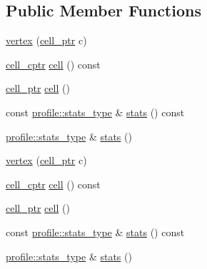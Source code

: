 \subsection*{Public Member Functions}
\begin{DoxyCompactItemize}
\item 
\hyperlink{classecto_1_1graph_1_1vertex_a18cea5500866c9d86ce252e84d3881c6}{vertex} (\hyperlink{namespaceecto_aed1809e82b9229ea81ef9ee3438cf62c}{cell\-\_\-ptr} c)
\item 
\hyperlink{namespaceecto_ab708c826226c91fd6f3c8c121f293a78}{cell\-\_\-cptr} \hyperlink{classecto_1_1graph_1_1vertex_aa5876238d51eb82bed7a17414bd74132}{cell} () const 
\item 
\hyperlink{namespaceecto_aed1809e82b9229ea81ef9ee3438cf62c}{cell\-\_\-ptr} \hyperlink{classecto_1_1graph_1_1vertex_a7b2bed5e1305cc26855c5bc8bc6884df}{cell} ()
\item 
const \hyperlink{structecto_1_1profile_1_1stats__type}{profile\-::stats\-\_\-type} \& \hyperlink{classecto_1_1graph_1_1vertex_a38bfe554aa3f8413769be22dff0ea2c3}{stats} () const 
\item 
\hyperlink{structecto_1_1profile_1_1stats__type}{profile\-::stats\-\_\-type} \& \hyperlink{classecto_1_1graph_1_1vertex_a522f60e25aa0d769b3826911e0c69d6f}{stats} ()
\item 
\hyperlink{classecto_1_1graph_1_1vertex_a18cea5500866c9d86ce252e84d3881c6}{vertex} (\hyperlink{namespaceecto_aed1809e82b9229ea81ef9ee3438cf62c}{cell\-\_\-ptr} c)
\item 
\hyperlink{namespaceecto_ab708c826226c91fd6f3c8c121f293a78}{cell\-\_\-cptr} \hyperlink{classecto_1_1graph_1_1vertex_aa5876238d51eb82bed7a17414bd74132}{cell} () const 
\item 
\hyperlink{namespaceecto_aed1809e82b9229ea81ef9ee3438cf62c}{cell\-\_\-ptr} \hyperlink{classecto_1_1graph_1_1vertex_a7b2bed5e1305cc26855c5bc8bc6884df}{cell} ()
\item 
const \hyperlink{structecto_1_1profile_1_1stats__type}{profile\-::stats\-\_\-type} \& \hyperlink{classecto_1_1graph_1_1vertex_a38bfe554aa3f8413769be22dff0ea2c3}{stats} () const 
\item 
\hyperlink{structecto_1_1profile_1_1stats__type}{profile\-::stats\-\_\-type} \& \hyperlink{classecto_1_1graph_1_1vertex_a522f60e25aa0d769b3826911e0c69d6f}{stats} ()
\end{DoxyCompactItemize}
